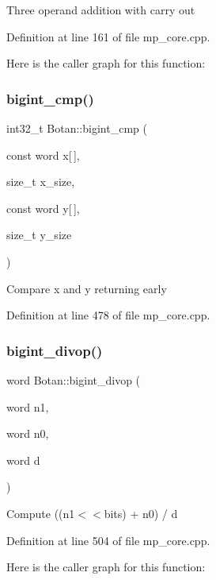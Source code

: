 Three operand addition with carry out 

Definition at line 161 of file mp\+\_\+core.\+cpp.

Here is the caller graph for this function\+:
\mbox{\label{namespace_botan_ada2360db2beff295a13a8e3a96136a61}} 
\subsubsection{\texorpdfstring{bigint\+\_\+cmp()}{bigint\_cmp()}}
{\footnotesize\ttfamily int32\+\_\+t Botan\+::bigint\+\_\+cmp (\begin{DoxyParamCaption}\item[{const word}]{x\mbox{[}$\,$\mbox{]},  }\item[{size\+\_\+t}]{x\+\_\+size,  }\item[{const word}]{y\mbox{[}$\,$\mbox{]},  }\item[{size\+\_\+t}]{y\+\_\+size }\end{DoxyParamCaption})}

Compare x and y returning early 

Definition at line 478 of file mp\+\_\+core.\+cpp.

\mbox{\label{namespace_botan_a02cea0cc0c767a608413ba0cac4e74c4}} 
\subsubsection{\texorpdfstring{bigint\+\_\+divop()}{bigint\_divop()}}
{\footnotesize\ttfamily word Botan\+::bigint\+\_\+divop (\begin{DoxyParamCaption}\item[{word}]{n1,  }\item[{word}]{n0,  }\item[{word}]{d }\end{DoxyParamCaption})}

Compute ((n1$<$$<$bits) + n0) / d 

Definition at line 504 of file mp\+\_\+core.\+cpp.

Here is the caller graph for this function\+:
\mbox{\label{namespace_botan_acffd94b3a9b524da12c07a88fdda1eb7}} 
